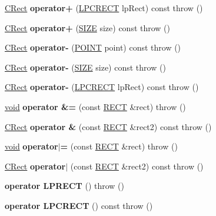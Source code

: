 \begin{DoxyCompactItemize}
\item 
\mbox{\label{class_c_rect_a8aa666fd4280dd02536146e3becc889d}} 
\hyperlink{class_c_rect}{C\+Rect} {\bfseries operator+} (\hyperlink{structtag_r_e_c_t}{L\+P\+C\+R\+E\+CT} lp\+Rect) const  throw ()
\item 
\mbox{\label{class_c_rect_a7704d16ea4851c1140636375c1d3e791}} 
\hyperlink{class_c_rect}{C\+Rect} {\bfseries operator+} (\hyperlink{structtag_s_i_z_e}{S\+I\+ZE} size) const  throw ()
\item 
\mbox{\label{class_c_rect_ab61cf9b3785ac59d73109dd7c17194de}} 
\hyperlink{class_c_rect}{C\+Rect} {\bfseries operator-\/} (\hyperlink{structtag_p_o_i_n_t}{P\+O\+I\+NT} point) const  throw ()
\item 
\mbox{\label{class_c_rect_a7e27e70055084b536a15da2bb991cfb4}} 
\hyperlink{class_c_rect}{C\+Rect} {\bfseries operator-\/} (\hyperlink{structtag_s_i_z_e}{S\+I\+ZE} size) const  throw ()
\item 
\mbox{\label{class_c_rect_a4730eb87ef3f5c2d4f09193a472e4e5b}} 
\hyperlink{class_c_rect}{C\+Rect} {\bfseries operator-\/} (\hyperlink{structtag_r_e_c_t}{L\+P\+C\+R\+E\+CT} lp\+Rect) const  throw ()
\item 
\mbox{\label{class_c_rect_ab575093fb9e8877cb50bbce16e3e66b8}} 
\hyperlink{interfacevoid}{void} {\bfseries operator \&=} (const \hyperlink{structtag_r_e_c_t}{R\+E\+CT} \&rect)  throw ()
\item 
\mbox{\label{class_c_rect_a4e26c0646f2f9c4772ab06aebc113367}} 
\hyperlink{class_c_rect}{C\+Rect} {\bfseries operator \&} (const \hyperlink{structtag_r_e_c_t}{R\+E\+CT} \&rect2) const  throw ()
\item 
\mbox{\label{class_c_rect_ab6f5d6b763f76346f7feb8acc92f81a5}} 
\hyperlink{interfacevoid}{void} {\bfseries operator$\vert$=} (const \hyperlink{structtag_r_e_c_t}{R\+E\+CT} \&rect)  throw ()
\item 
\mbox{\label{class_c_rect_adbc30948d8079c3a7f89247303fe8cf0}} 
\hyperlink{class_c_rect}{C\+Rect} {\bfseries operator$\vert$} (const \hyperlink{structtag_r_e_c_t}{R\+E\+CT} \&rect2) const  throw ()
\item 
\mbox{\label{class_c_rect_aaf59cffa043321b40f8826d671e941c3}} 
{\bfseries operator L\+P\+R\+E\+CT} ()  throw ()
\item 
\mbox{\label{class_c_rect_a54b53fa8c14d0a79f593b9e054ac111a}} 
{\bfseries operator L\+P\+C\+R\+E\+CT} () const  throw ()
\end{DoxyCompactItemize}
